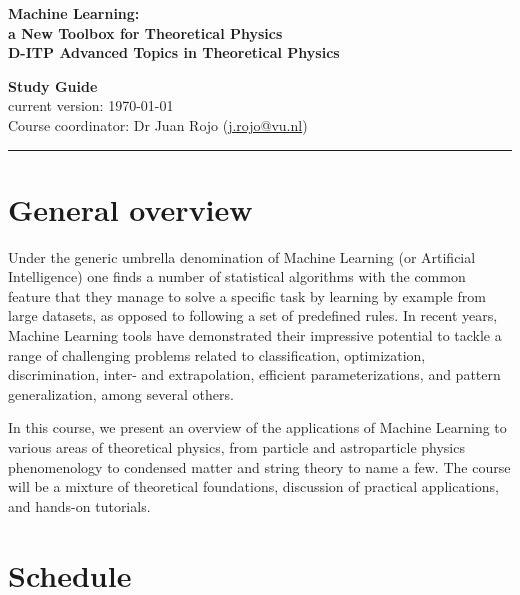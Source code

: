\documentclass[12pt]{article}
\numberwithin{equation}{section}
\begin{document}
\begin{spacing}{1.1}
\begin{figure}[h]
\begin{center}
\end{center}
\end{figure}


\begin{center}
  {\bf \Large  Machine Learning: \\[0.2cm]a New Toolbox for Theoretical Physics}\\[0.4cm]
   {\bf \large  D-ITP Advanced Topics in Theoretical Physics}\\[0.8cm]
  \end{center}

 
\begin{center}
  {\Large \bf Study Guide}\\
  current version: \today \\[0.3cm]

{\large  Course coordinator: Dr Juan Rojo (\href{mailto:j.rojo@vu.nl}{j.rojo@vu.nl}})
\end{center}



\vskip30pt
\hrule
\vskip20pt

\clearpage

\section{General overview}

Under the generic umbrella denomination of Machine Learning (or Artificial Intelligence) one finds a number of statistical algorithms with the common feature that they manage to solve a specific task by learning by example from large datasets, as opposed to following a set of predefined rules. In recent years, Machine Learning tools have demonstrated their impressive potential to tackle a range of challenging problems related to classification, optimization, discrimination, inter- and extrapolation, efficient parameterizations, and pattern generalization, among several others.

In this course, we present an overview of the applications of Machine Learning to various areas of theoretical physics, from particle and astroparticle physics phenomenology to condensed matter and string theory to name a few. The course will be a mixture of theoretical foundations, discussion of practical applications, and hands-on tutorials.

\section{Schedule}


\end{spacing}
\end{document}
